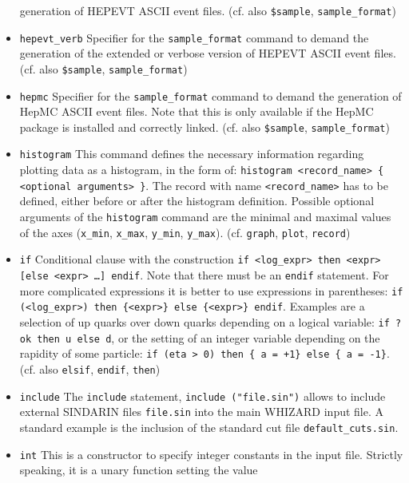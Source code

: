 \documentclass[12pt]{book}
\newcommand{\ttt}[1]{\texttt{#1}}
\begin{document}
\begin{itemize}
generation of HEPEVT ASCII event files. (cf. also \ttt{\$sample},
\ttt{sample\_format}) 
\item
\ttt{hepevt\_verb} \newline 
Specifier for the \ttt{sample\_format} command to demand the
generation of the extended or verbose version of HEPEVT ASCII event
files. (cf. also \ttt{\$sample}, \ttt{sample\_format}) 
\item
\ttt{hepmc} \newline 
Specifier for the \ttt{sample\_format} command to demand the
generation of HepMC ASCII event files. Note that this is only
available if the HepMC package is installed and correctly
linked. (cf. also \ttt{\$sample}, \ttt{sample\_format}) 
\item
\ttt{histogram} \newline
This command defines the necessary information regarding plotting data
as a histogram, in the form of: \ttt{histogram <record\_name> \{
<optional arguments> \}}. The record with name \ttt{<record\_name>} has to be
defined, either before or after the histogram definition. Possible optional
arguments of the \ttt{histogram} command are the minimal and maximal values
of the axes (\ttt{x\_min}, \ttt{x\_max}, \ttt{y\_min}, \ttt{y\_max}). 
(cf. \ttt{graph}, \ttt{plot}, \ttt{record})
\item
\ttt{if} \newline
Conditional clause with the construction \ttt{if <log\_expr> then
<expr> [else <expr> \ldots] endif}. Note that there must be an
\ttt{endif}  statement. For more complicated expressions it is better
to use expressions in parentheses: \ttt{if (<log\_expr>) then
\{<expr>\} else \{<expr>\} endif}. Examples are a selection of up quarks
over down quarks depending on a logical variable: \ttt{if ?ok then u
  else d}, or the setting of an integer variable depending on the
rapidity of some particle: \ttt{if (eta > 0) then \{ a = +1\} else
\{ a = -1\}}. (cf. also \ttt{elsif}, \ttt{endif}, \ttt{then})
\item
\ttt{include} \newline
The \ttt{include} statement, \ttt{include ("file.sin")} allows to
include external SINDARIN files \ttt{file.sin} into the main WHIZARD
input file. A standard example is the inclusion of the standard cut
file \ttt{default\_cuts.sin}.
\item
\ttt{int} \newline
This is a constructor to specify integer constants in the input
file. Strictly speaking, it is a unary function setting the value

\end{itemize}
\end{document}
